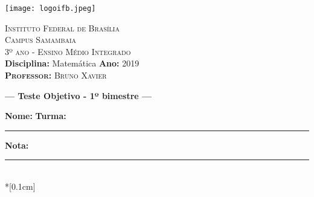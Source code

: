 \documentclass[11pt,a4paper]{article}
\begin{document}
\frenchspacing
\begin{center}
    \begin{minipage}{4cm}
		\begin{center}
			\texttt{[image: logoifb.jpeg]}
		\end{center}
	\end{minipage}
	\begin{minipage}{11.4cm}
		\begin{center}
				{\small \textsc{Instituto Federal de Brasília}			\\
						  \textsc{Campus Samambaia}\\
						  \textsc{3º ano - Ensino Médio Integrado} \\
                         \textbf{Disciplina:} Matemática \hspace{.65cm}\textbf{Ano:} 2019\\
                          \textsc{\textbf{Professor:} Bruno Xavier}\\
                }
		\end{center}
	\end{minipage}
\end{center}


{\sf
  \begin{center}
    \Large \textbf{--- Teste Objetivo - 1º bimestre ---}%
  \end{center}
}\bigskip

\setlength{\marginparwidth}{5cm}
\small \noindent \textbf{Nome:}\hspace{0.3cm}\hrulefill \hrulefill
\hrulefill \hspace{0.1cm}
\textbf{Turma:}\hspace{0.1cm}\rule{1cm}{.1mm} \textbf{Nota:}\hspace{0.1cm}\rule{1cm}{.1mm}\\*[0.1cm]


\thispagestyle{empty}\bigskip

\end{document}
